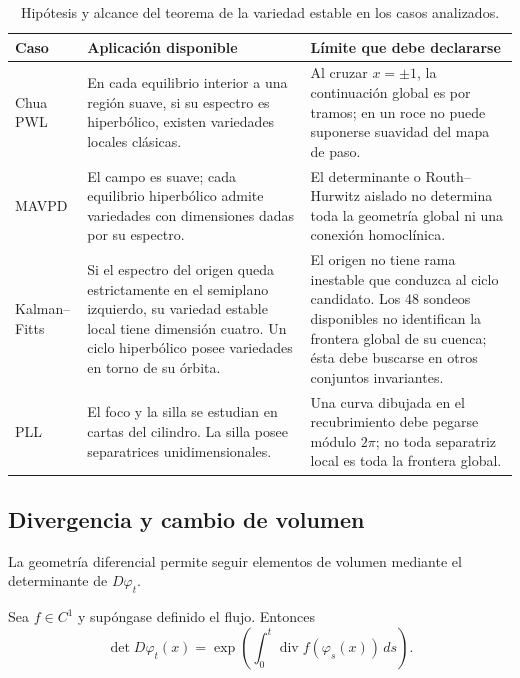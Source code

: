 \begin{table}[H]
\centering
\caption{Hipótesis y alcance del teorema de la variedad estable en los casos analizados.}
\label{geo:tab:stable-manifold-scope}
\small
\begin{tabularx}{\textwidth}{@{}L{0.17\textwidth}YY@{}}
\toprule
Caso & Aplicación disponible & Límite que debe declararse \\
\midrule
Chua PWL & En cada equilibrio interior a una región suave, si su espectro es
hiperbólico, existen variedades locales clásicas. & Al cruzar \(x=\pm1\), la
continuación global es por tramos; en un roce no puede suponerse suavidad del
mapa de paso. \\
MAVPD & El campo es suave; cada equilibrio hiperbólico admite variedades con
dimensiones dadas por su espectro. & El determinante o Routh--Hurwitz aislado
no determina toda la geometría global ni una conexión homoclínica. \\
Kalman--Fitts & Si el espectro del origen queda estrictamente en el
semiplano izquierdo, su variedad estable local tiene dimensión cuatro. Un
ciclo hiperbólico posee variedades en torno de su órbita. & El
origen no tiene rama inestable que conduzca al ciclo candidato. Los 48 sondeos
disponibles no identifican la frontera global de su cuenca; ésta debe buscarse
en otros conjuntos invariantes. \\
PLL & El foco y la silla se estudian en cartas del cilindro. La silla posee
separatrices unidimensionales. & Una curva dibujada en el recubrimiento debe
pegarse módulo \(2\pi\); no toda separatriz local es toda la frontera global.
\\
\bottomrule
\end{tabularx}
\end{table}

\subsection{Divergencia y cambio de volumen}

La geometría diferencial permite seguir elementos de volumen mediante el
determinante de \(D\varphi_t\).

\begin{proposition}
Sea \(f\in C^1\) y supóngase definido el flujo. Entonces
\begin{equation}
 \det D\varphi_t(x)=
 \exp\!\left(
   \int_0^t\operatorname{div}f(\varphi_s(x))\,ds
 \right).
 \label{geo:eq:liouville-volume}
\end{equation}
\end{proposition}

